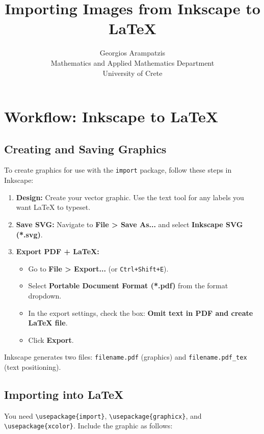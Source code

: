 \documentclass[10pt]{article}
\title{Importing Images from Inkscape to \LaTeX}
\author{Georgios Arampatzis\\Mathematics and Applied Mathematics Department\\University of Crete}
\date{}
\begin{document}
\maketitle



\section{Workflow: Inkscape to LaTeX}

\subsection{Creating and Saving Graphics}
To create graphics for use with the \texttt{import} package, follow these steps in
Inkscape:

\begin{enumerate}
    \item \textbf{Design:} Create your vector graphic. Use the text tool for any
    labels you want \LaTeX{} to typeset.
    \item \textbf{Save SVG:} Navigate to \textbf{File \textgreater{} Save As...} and
    select \textbf{Inkscape SVG (*.svg)}.
    \item \textbf{Export PDF + LaTeX:}
    \begin{itemize}
        \item Go to \textbf{File \textgreater{} Export...} (or \texttt{Ctrl+Shift+E}).
        \item Select \textbf{Portable Document Format (*.pdf)} from the format
        dropdown.
        \item In the export settings, check the box: \textbf{Omit text in PDF and
        create LaTeX file}.
        \item Click \textbf{Export}.
    \end{itemize}
\end{enumerate}



Inkscape generates two files: \texttt{filename.pdf} (graphics) and
\texttt{filename.pdf\_tex} (text positioning).

\subsection{Importing into LaTeX}

You need \texttt{\textbackslash usepackage\{import\}}, \texttt{\textbackslash usepackage\{graphicx\}}, and \texttt{\textbackslash usepackage\{xcolor\}}.
Include the graphic as follows:
\end{document}
